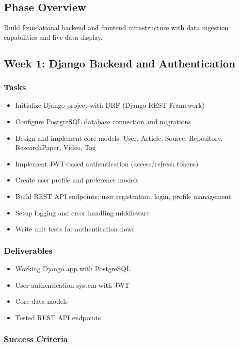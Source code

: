 \documentclass[12pt,oneside]{report}
\begin{document}
\subsection{Phase Overview}

Build foundational backend and frontend infrastructure with data ingestion capabilities and live data display.

\subsection{Week 1: Django Backend and Authentication}

\subsubsection{Tasks}

\begin{itemize}
    \item Initialize Django project with DRF (Django REST Framework)
    \item Configure PostgreSQL database connection and migrations
    \item Design and implement core models: User, Article, Source, Repository, ResearchPaper, Video, Tag
    \item Implement JWT-based authentication (access/refresh tokens)
    \item Create user profile and preference models
    \item Build REST API endpoints: user registration, login, profile management
    \item Setup logging and error handling middleware
    \item Write unit tests for authentication flows
\end{itemize}

\subsubsection{Deliverables}

\begin{itemize}
    \item Working Django app with PostgreSQL
    \item User authentication system with JWT
    \item Core data models
    \item Tested REST API endpoints
\end{itemize}

\subsubsection{Success Criteria}
\end{document}
